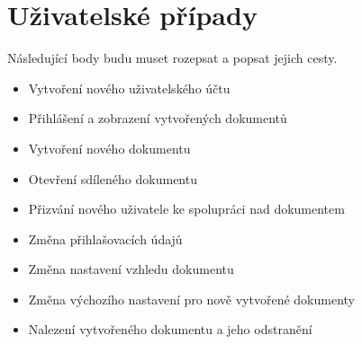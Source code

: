 
\section{Uživatelské případy}\label{sec:uzivatelskePripady}

Následující body budu muset rozepsat a popsat jejich cesty.

\begin{itemize}
    \item Vytvoření nového uživatelského účtu
    \item Přihlášení a zobrazení vytvořených dokumentů
    \item Vytvoření nového dokumentu
    \item Otevření sdíleného dokumentu
    \item Přizvání nového uživatele ke spolupráci nad dokumentem
    \item Změna přihlašovacích údajů
    \item Změna nastavení vzhledu dokumentu
    \item Změna výchozího nastavení pro nově vytvořené dokumenty
    \item Nalezení vytvořeného dokumentu a jeho odstranění
\end{itemize}
